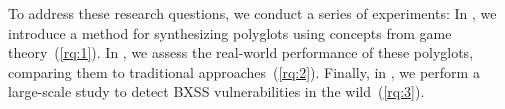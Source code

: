 To address these research questions, we conduct a series of experiments:
In , we introduce a method for synthesizing polyglots using concepts from game theory~(\ref{rq:1}).
In , we assess the real-world performance of these polyglots, comparing them to traditional approaches~(\ref{rq:2}).
Finally, in , we perform a large-scale study to detect BXSS vulnerabilities in the wild~(\ref{rq:3}).


